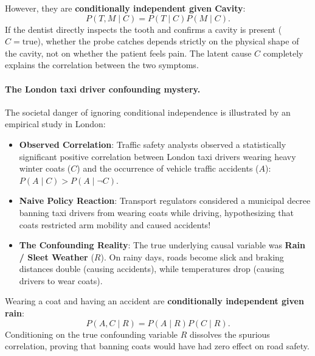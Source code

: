 However, they are \textbf{conditionally independent given Cavity}:
\begin{equation}
P(T, M \mid C) = P(T \mid C) P(M \mid C).
\end{equation}
If the dentist directly inspects the tooth and confirms a cavity is present ($C = \text{true}$), whether the probe catches depends strictly on the physical shape of the cavity, not on whether the patient feels pain. The latent cause $C$ completely explains the correlation between the two symptoms.

\paragraph{The London taxi driver confounding mystery.}
The societal danger of ignoring conditional independence is illustrated by an empirical study in London:
\begin{itemize}[noitemsep]
  \item \textbf{Observed Correlation}: Traffic safety analysts observed a statistically significant positive correlation between London taxi drivers wearing heavy winter coats ($C$) and the occurrence of vehicle traffic accidents ($A$): $P(A \mid C) > P(A \mid \neg C)$.
  \item \textbf{Naive Policy Reaction}: Transport regulators considered a municipal decree banning taxi drivers from wearing coats while driving, hypothesizing that coats restricted arm mobility and caused accidents!
  \item \textbf{The Confounding Reality}: The true underlying causal variable was \textbf{Rain / Sleet Weather} ($R$). On rainy days, roads become slick and braking distances double (causing accidents), while temperatures drop (causing drivers to wear coats).
\end{itemize}
Wearing a coat and having an accident are \textbf{conditionally independent given rain}:
\begin{equation}
P(A, C \mid R) = P(A \mid R) P(C \mid R).
\end{equation}
Conditioning on the true confounding variable $R$ dissolves the spurious correlation, proving that banning coats would have had zero effect on road safety.

